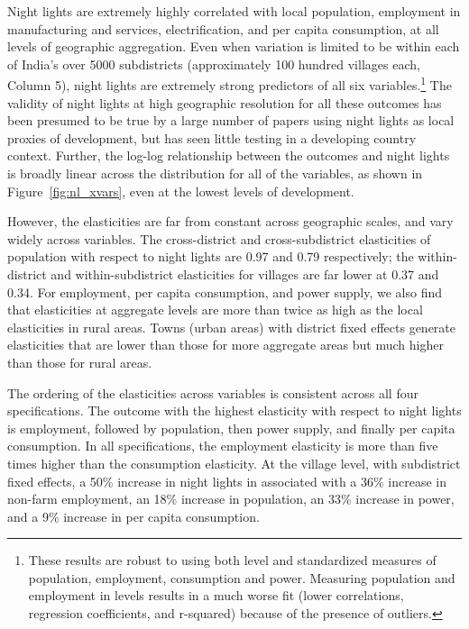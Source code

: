 \documentclass[12pt,letterpaper]{article}
\begin{document}
Night lights are extremely highly correlated with local population,
employment in manufacturing and services, electrification, and per
capita consumption, at all levels of geographic aggregation. Even when
variation is limited to be within each of India's over 5000 subdistricts
(approximately 100 hundred villages each, Column 5), night lights are
extremely strong predictors of all six variables.\footnote{These
  results are robust to using both level and standardized measures of
  population, employment, consumption and power. Measuring population
  and employment in levels results in a much worse fit (lower
  correlations, regression coefficients, and r-squared) because of the
  presence of outliers.} The validity of night lights at high
geographic resolution for all these outcomes has been presumed to be
true by a large number of papers using night lights as local proxies
of development, but has seen little testing in a developing country
context. Further, the log-log relationship between the outcomes and
night lights is broadly linear across the distribution for all of the
variables, as shown in Figure~\ref{fig:nl_xvars}, even at the lowest
levels of development.

However, the elasticities are far from constant across geographic
scales, and vary widely across variables. The cross-district and
cross-subdistrict elasticities of population with respect to night
lights are 0.97 and 0.79 respectively; the within-district and
within-subdistrict elasticities for villages are far lower at 0.37 and
0.34. For employment, per capita consumption, and power supply, we
also find that elasticities at aggregate levels are more than twice as
high as the local elasticities in rural areas. Towns (urban areas)
with district fixed effects generate elasticities that are lower than
those for more aggregate areas but much higher than those for rural
areas. 

The ordering of the elasticities across variables is consistent across
all four specifications. The outcome with the highest elasticity with
respect to night lights is employment, followed by population, then
power supply, and finally per capita consumption. In all
specifications, the employment elasticity is more than five times
higher than the consumption elasticity. At the village level, with
subdistrict fixed effects, a 50\%
increase in night lights in associated with a 36\% increase in
non-farm employment, an 18\% increase in population, an 33\% increase in
power, and a 9\% increase in per capita consumption.
\end{document}
